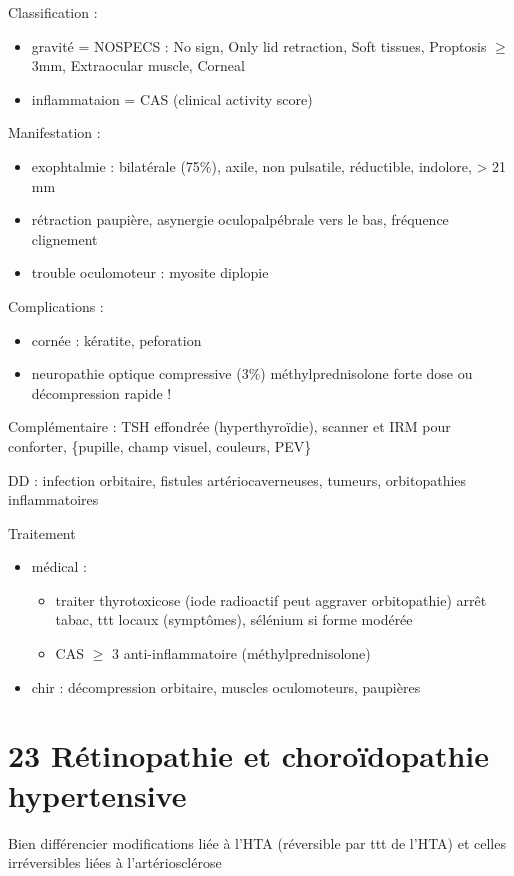 \documentclass[11pt]{article}
\begin{document}
Classification :
\begin{itemize}
\item gravité = NOSPECS : No sign, Only lid retraction, Soft tissues, Proptosis \(\ge\)
3mm, Extraocular muscle, Corneal
\item inflammataion = CAS
(clinical activity score)
\end{itemize}

Manifestation :
\begin{itemize}
\item exophtalmie : bilatérale (75\%), axile, non pulsatile, réductible, indolore,
> 21 mm
\item rétraction paupière, asynergie oculopalpébrale vers le bas, \dec fréquence
clignement
\item trouble oculomoteur : myosite \thus diplopie
\end{itemize}

Complications :
\begin{itemize}
\item cornée : kératite, peforation
\item neuropathie optique compressive (3\%) \thus méthylprednisolone forte dose ou
décompression rapide \skull !
\end{itemize}

Complémentaire : TSH effondrée (hyperthyroïdie), scanner et IRM pour conforter,
\{pupille, champ visuel, couleurs, PEV\}

DD : infection orbitaire, fistules artériocaverneuses, tumeurs, orbitopathies
inflammatoires

Traitement 
\begin{itemize}
\item médical : 
\begin{itemize}
\item traiter thyrotoxicose (\danger iode radioactif peut aggraver orbitopathie) arrêt tabac, ttt locaux (symptômes), sélénium si forme modérée
\item CAS \(\ge\) 3 \thus anti-inflammatoire (méthylprednisolone)
\end{itemize}
\item chir : décompression orbitaire, muscles oculomoteurs, paupières
\end{itemize}
\section{23 Rétinopathie et choroïdopathie hypertensive}
\label{sec:org07c1871}
Bien différencier modifications liée à l'HTA (réversible par ttt de l'HTA) et
celles irréversibles liées à l'artériosclérose 
\end{document}
